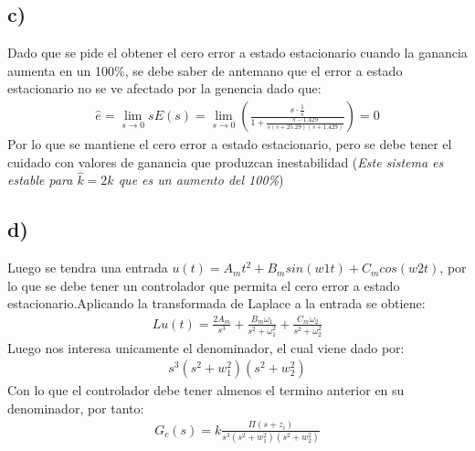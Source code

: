 \documentclass[
  11pt,
  letterpaper,
   addpoints,
   answers
  ]{exam}
\begin{document}
\begin{questions}
\begin{solution}
\subsection*{c)}
Dado que se pide el obtener el cero error a estado estacionario cuando la ganancia aumenta en un 100\%, se debe saber de antemano que el error a estado estacionario no se ve afectado por la genencia dado que:
\begin{align}
    \hat{e}= \lim_{s \to 0} sE(s) = \lim_{s \to 0} \left(\frac{s \cdot \frac{1}{s}}{1+ \frac{s-1.429}{s(s+25.29)(s+1.429)}}\right) = 0
\end{align}
Por lo que se mantiene el cero error a estado estacionario, pero se debe tener el cuidado con valores de ganancia que produzcan inestabilidad (\textit{Este sistema es estable para $\hat{k} = 2k$ que es un aumento del 100\%})
\subsection*{d)}
Luego se tendra una entrada $u(t)= A_m t^{2} + B_m sin(w1t) + C_m cos(w2t)$, por lo que se debe tener un controlador que permita el cero error a estado estacionario.Aplicando la transformada de Laplace a la entrada se obtiene:
\begin{align}
    L{u(t)} = \frac{2A_m}{s^{3}} + \frac{B_m \omega_{1}}{s^{2} + \omega_{1}^{2}} + \frac{C_m \omega_{2}}{s^{2} + \omega_{2}^{2}}
\end{align}
Luego nos interesa unicamente el denominador, el cual viene dado por:
\begin{align}
    s^{3}(s^{2}+w_{1}^{2})(s^{2} + w_{2}^{2})
\end{align}
Con lo que el controlador debe tener almenos el termino anterior en su denominador, por tanto:
\begin{align}
    G_{c}(s) = k \frac{\Pi (s+ z_{i}) }{ s^{3}(s^{2}+w_{1}^{2})(s^{2} + w_{2}^{2})}
\end{align}


\end{solution}
\end{questions}
\end{document}
